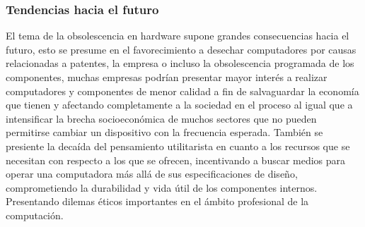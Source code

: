 \documentclass[10pt,journal,compsoc]{IEEEtran}
\begin{document}
\subsubsection{Tendencias hacia el futuro}
El tema de la obsolescencia en hardware supone grandes consecuencias hacia el futuro, esto se
presume en el favorecimiento a desechar computadores por causas relacionadas a patentes, la
empresa o incluso la obsolescencia programada de los componentes\cite{tacha2009mitigate},
muchas empresas podrían presentar mayor interés a realizar computadores y componentes de menor calidad a fin de salvaguardar la economía que tienen y afectando completamente a la sociedad en el proceso al igual que a intensificar la brecha socioeconómica de muchos sectores que no pueden permitirse cambiar un dispositivo con la frecuencia esperada.
También se presiente la decaída del pensamiento utilitarista en cuanto a los recursos que se
necesitan con respecto a los que se ofrecen, incentivando a buscar medios para operar una
computadora más allá de sus especificaciones de diseño, comprometiendo la durabilidad y vida útil
de los componentes internos. Presentando dilemas éticos importantes en el ámbito profesional de
la computación. \cite{4116968} \cite{9425823}
\end{document}
